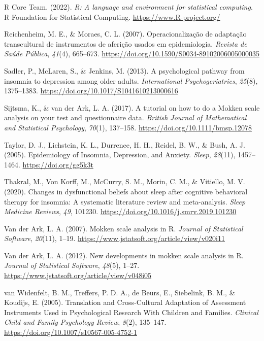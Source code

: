\documentclass[
  ,doc,11pt, twoside,floatsintext]{apa6}
\newlength{\cslhangindent}
\newlength{\cslentryspacingunit} %
\newenvironment{CSLReferences}[2] %
 {%
  \setlength{\parindent}{0pt}
  \ifodd #1
  \let\oldpar\par
  \def\par{\hangindent=\cslhangindent\oldpar}
  \fi
  \setlength{\parskip}{#2\cslentryspacingunit}
 }%
 {}
\begin{document}
\begin{CSLReferences}{1}{0}
\leavevmode{}%
R Core Team. (2022). \emph{R: A language and environment for statistical computing}. R Foundation for Statistical Computing. \url{https://www.R-project.org/}

\leavevmode{}%
Reichenheim, M. E., \& Moraes, C. L. (2007). {Operacionalização de adaptação transcultural de instrumentos de aferição usados em epidemiologia}. \emph{Revista de Saúde Pública}, \emph{41}(4), 665--673. \url{https://doi.org/10.1590/S0034-89102006005000035}

\leavevmode{}%
Sadler, P., McLaren, S., \& Jenkins, M. (2013). A psychological pathway from insomnia to depression among older adults. \emph{International Psychogeriatrics}, \emph{25}(8), 1375--1383. \url{https://doi.org/10.1017/S1041610213000616}

\leavevmode{}%
Sijtsma, K., \& van der Ark, L. A. (2017). A tutorial on how to do a {Mokken} scale analysis on your test and questionnaire data. \emph{British Journal of Mathematical and Statistical Psychology}, \emph{70}(1), 137--158. \url{https://doi.org/10.1111/bmsp.12078}

\leavevmode{}%
Taylor, D. J., Lichstein, K. L., Durrence, H. H., Reidel, B. W., \& Bush, A. J. (2005). Epidemiology of {Insomnia}, {Depression}, and {Anxiety}. \emph{Sleep}, \emph{28}(11), 1457--1464. \url{https://doi.org/gg5k3t}

\leavevmode{}%
Thakral, M., Von Korff, M., McCurry, S. M., Morin, C. M., \& Vitiello, M. V. (2020). Changes in dysfunctional beliefs about sleep after cognitive behavioral therapy for insomnia: {A} systematic literature review and meta-analysis. \emph{Sleep Medicine Reviews}, \emph{49}, 101230. \url{https://doi.org/10.1016/j.smrv.2019.101230}

\leavevmode{}%
Van der Ark, L. A. (2007). Mokken scale analysis in {R}. \emph{Journal of Statistical Software}, \emph{20}(11), 1--19. \url{https://www.jstatsoft.org/article/view/v020i11}

\leavevmode{}%
Van der Ark, L. A. (2012). New developments in mokken scale analysis in {R}. \emph{Journal of Statistical Software}, \emph{48}(5), 1--27. \url{https://www.jstatsoft.org/article/view/v048i05}

\leavevmode{}%
van Widenfelt, B. M., Treffers, P. D. A., de Beurs, E., Siebelink, B. M., \& Koudijs, E. (2005). Translation and {Cross-Cultural Adaptation} of {Assessment Instruments Used} in {Psychological Research With Children} and {Families}. \emph{Clinical Child and Family Psychology Review}, \emph{8}(2), 135--147. \url{https://doi.org/10.1007/s10567-005-4752-1}


\end{CSLReferences}
\end{document}
